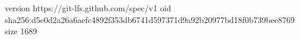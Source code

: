 version https://git-lfs.github.com/spec/v1
oid sha256:d5e0d2a26a6aefc4892f353db6741d597371d9a92b20977bd18f0b739bee8769
size 1689
